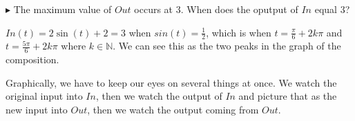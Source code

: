 \documentclass{ximera}
\begin{document}
$\blacktriangleright$ The maximum value of $Out$ occurs at $3$.  When does the oputput of $In$ equal $3$?



$In(t) = 2 \sin(t)+2 = 3$ when $sin(t) = \frac{1}{2}$, which is when $t = \frac{\pi}{6} + 2k\pi$ and $t = \frac{5\pi}{6} + 2k\pi$ where $k \in \mathbb{N}$. We can see this as the two peaks in the graph of the composition.

















Graphically, we have to keep our eyes on several things at once.  We watch the original input into $In$, then we watch the output of $In$ and picture that as the new input into $Out$, then we watch the output coming from $Out$.
\end{document}
